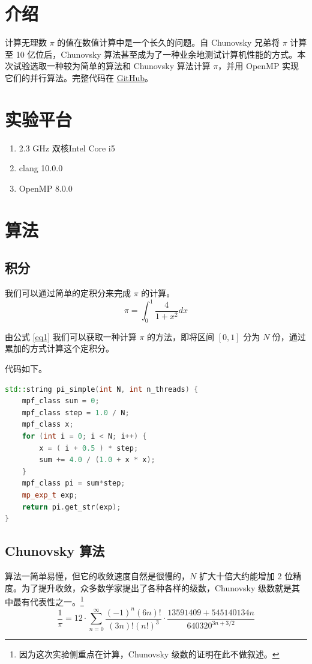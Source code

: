 \documentclass{zjureport-zh}
\begin{document}
\makecover

\section{介绍}
\par 计算无理数 $\pi$ 的值在数值计算中是一个长久的问题。自 Chunovsky 兄弟将 $\pi$ 计算至 10 亿位后，Chunovsky 算法甚至成为了一种业余地测试计算机性能的方式。本次试验选取一种较为简单的算法和 Chunovsky 算法计算 $\pi$，并用 OpenMP 实现它们的并行算法。完整代码在 \hyperlink{https://github.com/zhuo34/openmp-pi}{GitHub}。

\section{实验平台}
\begin{enumerate}[label=(\arabic*)]
	\item 2.3 GHz 双核Intel Core i5
	\item clang 10.0.0
	\item OpenMP 8.0.0
\end{enumerate}

\section{算法}
\subsection{积分}
\par 我们可以通过简单的定积分来完成 $\pi$ 的计算。
\begin{equation}
	\pi = \int_0^1 \frac{4}{1+x^2} dx \label{eq1}
\end{equation}

\par 由公式 \ref{eq1} 我们可以获取一种计算 $\pi$ 的方法，即将区间 $[0, 1]$ 分为 $N$ 份，通过累加的方式计算这个定积分。
\par 代码如下。
\begin{lstlisting}[language=c++]
std::string pi_simple(int N, int n_threads) {
	mpf_class sum = 0;
	mpf_class step = 1.0 / N;
	mpf_class x;
	for (int i = 0; i < N; i++) {
		x = ( i + 0.5 ) * step;
		sum += 4.0 / (1.0 + x * x);
	}
	mpf_class pi = sum*step;
	mp_exp_t exp;
	return pi.get_str(exp);
}
\end{lstlisting}


\subsection{Chunovsky 算法}
\par 算法一简单易懂，但它的收敛速度自然是很慢的，$N$ 扩大十倍大约能增加 2 位精度。为了提升收敛，众多数学家提出了各种各样的级数，Chunovsky 级数就是其中最有代表性之一。\footnote{因为这次实验侧重点在计算，Chunovsky 级数的证明在此不做叙述。}
\begin{equation}
	\frac{1}{\pi} = 12\cdot\sum\limits_{n=0}^{\infty} \frac{(-1)^n(6n)!}{(3n)!(n!)^3} \cdot \frac{13591409+545140134n}{640320^{3n+3/2}} \label{eq2}
\end{equation}
\end{document}
